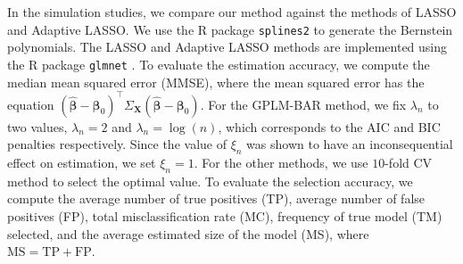 \documentclass[11pt]{article}
\begin{document}
In the simulation studies, we compare our method against the methods of LASSO and Adaptive LASSO. We use the R package \verb|splines2| \citep{splines2-paper} to generate the Bernstein polynomials. The LASSO and Adaptive LASSO methods are implemented using the R package \verb|glmnet| \citep{glmnet2010,simon2011regularization}.  To evaluate the estimation accuracy, we compute the median mean squared error (MMSE), where the mean squared error has the equation $(\hat{\boldsymbol{\beta}} - \boldsymbol{\beta}_0)^\top \Sigma_\textbf{X} (\hat{\boldsymbol{\beta}} - \boldsymbol{\beta}_0)$. For the GPLM-BAR method, we fix $\lambda_n$ to two values, $\lambda_n=2$ and $\lambda_n = \log(n)$, which corresponds to the AIC and BIC penalties respectively. Since the value of $\xi_n$ was  shown to have an inconsequential effect on estimation, we set $\xi_n = 1$. For the other methods, we use $10$-fold CV method to select the optimal value. To evaluate the selection accuracy, we compute the average number of true positives (TP), average number of false positives (FP), total misclassification rate (MC), frequency of true model (TM) selected, and the average estimated size of the model (MS), where $\text{MS} = \text{TP} + \text{FP}$. 
\end{document}

